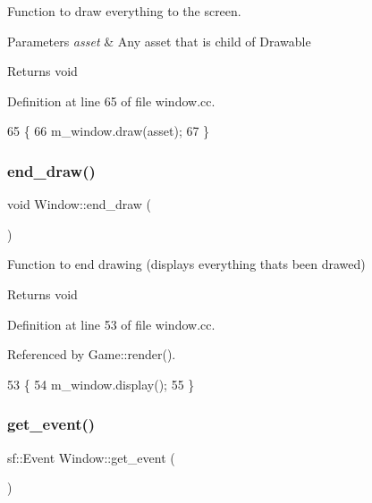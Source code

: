 Function to draw everything to the screen. 


\begin{DoxyParams}{Parameters}
{\em asset} & Any asset that is child of Drawable \\
\hline
\end{DoxyParams}
\begin{DoxyReturn}{Returns}
void 
\end{DoxyReturn}


Definition at line 65 of file window.\+cc.


\begin{DoxyCode}
65                                    \{
66     m\_window.draw(asset);
67 \}
\end{DoxyCode}
\mbox{\label{class_window_ae2d4995568b0bb68fd8dceff3cce216c}} 
\subsubsection{\texorpdfstring{end\+\_\+draw()}{end\_draw()}}
{\footnotesize\ttfamily void Window\+::end\+\_\+draw (\begin{DoxyParamCaption}{ }\end{DoxyParamCaption})}



Function to end drawing (displays everything that\textquotesingle{}s been drawed) 

\begin{DoxyReturn}{Returns}
void 
\end{DoxyReturn}


Definition at line 53 of file window.\+cc.



Referenced by Game\+::render().


\begin{DoxyCode}
53                       \{
54     m\_window.display();
55 \}
\end{DoxyCode}
\mbox{\label{class_window_a878ba53cecdd324dd80274caa0c98a7c}} 
\subsubsection{\texorpdfstring{get\+\_\+event()}{get\_event()}}
{\footnotesize\ttfamily sf\+::\+Event Window\+::get\+\_\+event (\begin{DoxyParamCaption}{ }\end{DoxyParamCaption})}




